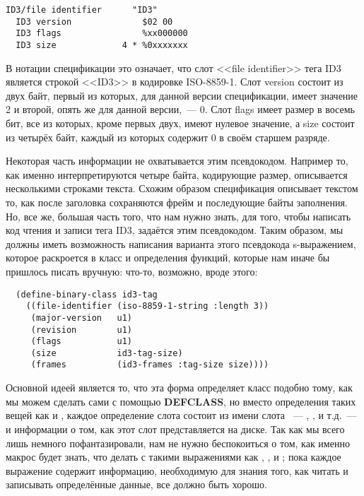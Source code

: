 \begin{lstlisting}[style=lisprepl]
  ID3/file identifier      "ID3"
  ID3 version              $02 00
  ID3 flags                %xx000000
  ID3 size             4 * %0xxxxxxx
\end{lstlisting}

В нотации спецификации это означает, что слот <<file identifier>> тега ID3 является строкой
<<ID3>> в кодировке ISO-8859-1. Слот version состоит из двух байт, первый из которых, для
данной версии спецификации, имеет значение 2 и второй, опять же для данной версии,~---
0. Слот flags имеет размер в восемь бит, все из которых, кроме первых двух, имеют нулевое
значение, а size состоит из четырёх байт, каждый из которых содержит 0 в своём старшем
разряде.

Некоторая часть информации не охватывается этим псевдокодом. Например то, как именно
интерпретируются четыре байта, кодирующие размер, описывается несколькими строками
текста. Схожим образом спецификация описывает текстом то, как после заголовка сохраняются
фрейм и последующие байты заполнения. Но, все же, большая часть того, что нам нужно знать,
для того, чтобы написать код чтения и записи тега ID3, задаётся этим псевдокодом. Таким
образом, мы должны иметь возможность написания варианта этого псевдокода s-выражением,
которое раскроется в класс и определения функций, которые нам иначе бы пришлось писать
вручную: что-то, возможно, вроде этого:

\begin{lstlisting}
  (define-binary-class id3-tag
    ((file-identifier (iso-8859-1-string :length 3))
     (major-version   u1)
     (revision        u1)
     (flags           u1)
     (size            id3-tag-size)
     (frames          (id3-frames :tag-size size))))
\end{lstlisting}

Основной идеей является то, что эта форма определяет класс  подобно тому,
как мы можем сделать сами с помощью \textbf{DEFCLASS}, но вместо определения таких вещей
как  и , каждое определение слота состоит из имени слота
~--- , , и т.д.~--- и информации о том, как этот
слот представляется на диске. Так как мы всего лишь немного пофантазировали, нам не нужно
беспокоиться о том, как именно макрос  будет знать, что делать с
такими выражениями как , ,
 и ; пока каждое выражение содержит
информацию, необходимую для знания того, как читать и записывать определённые данные, все
должно быть хорошо.

